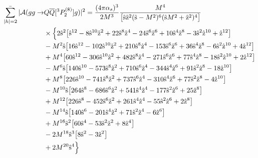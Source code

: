 \documentclass[aps,prc,preprint,superscriptaddress,showpacs,showkeys,amsmath]{revtex4-1}
\begin{document}
\begin{itemize}
\begin{equation}
\begin{split}
\mathop{{\bar{\sum_{|h|=2}}}} | {\cal A}(gg \to & Q{\overline Q}[ ^3P_2^{(8)}] g) |^2 ={(4\pi {\alpha_{s}})^3 \over 2 M^3}\frac{M^4}{\bigl[ \hat{\rm s} \hat{\rm z}^2 (\hat{\rm s}-M^2)^6 (\hat{\rm s} M^2 + \hat{\rm z}^2)^4 \bigr]}\\ 
                                     & \times  \Bigl\{ 2 \hat{\rm s}^2 \bigl[ \hat{\rm s}^{12} - 8 \hat{\rm s}^{10} \hat{\rm z}^2 + 22 \hat{\rm s}^8 \hat{\rm z}^4 - 24 \hat{\rm s}^6  \hat{\rm z}^6 + 10 \hat{\rm s}^4 \hat{\rm z}^8 - 3 \hat{\rm s}^2 \hat{\rm z}^{10} + \hat{\rm z}^{12} \bigr] \\
                                     & - M^2 \hat{\rm s} \bigl[ 16 \hat{\rm s}^{12} - 102 \hat{\rm s}^{10} \hat{\rm z}^2  + 210 \hat{\rm s}^8 \hat{\rm z}^4 - 153 \hat{\rm s}^6 \hat{\rm z}^6 + 36 \hat{\rm s}^4 \hat{\rm z}^8  - 6 \hat{\rm s}^2 \hat{\rm z}^{10}  + 4 \hat{\rm z}^{12} \bigr] \\
                                     & + M^4 \bigl[ 60 \hat{\rm s}^{12} - 306 \hat{\rm s}^{10} \hat{\rm z}^2  + 482 \hat{\rm s}^8 \hat{\rm z}^4 - 271 \hat{\rm s}^6 \hat{\rm z}^6 + 77 \hat{\rm s}^4 \hat{\rm z}^8 - 18 \hat{\rm s}^2 \hat{\rm z}^{10}  + 2 \hat{\rm z}^{12} \bigr] \\
                                     & - M^6 \hat{\rm s} \bigl[ 140 \hat{\rm s}^{10} - 573 \hat{\rm s}^8 \hat{\rm z}^2 + 710 \hat{\rm s}^6 \hat{\rm z}^4 - 344 \hat{\rm s}^4 \hat{\rm z}^6 + 91 \hat{\rm s}^2 \hat{\rm z}^8 - 18 \hat{\rm z}^{10} \bigr] \\
                                     & + M^8 \bigl[ 226 \hat{\rm s}^{10} - 741 \hat{\rm s}^8 \hat{\rm z}^2 + 737 \hat{\rm s}^6 \hat{\rm z}^4 - 310 \hat{\rm s}^4 \hat{\rm z}^6 + 77 \hat{\rm s}^2 \hat{\rm z}^8 - 4 \hat{\rm z}^{10} \bigr] \\
                                     & - M^{10} \hat{\rm s} \bigl[ 264 \hat{\rm s}^8 - 686 \hat{\rm s}^6 \hat{\rm z}^2 + 541 \hat{\rm s}^4 \hat{\rm z}^4 - 177 \hat{\rm s}^2 \hat{\rm z}^6 + 25 \hat{\rm z}^8 \bigr] \\
                                     & + M^{12} \bigl[ 226 \hat{\rm s}^8 - 452 \hat{\rm s}^6 \hat{\rm z}^2 + 261 \hat{\rm s}^4 \hat{\rm z}^4 - 55 \hat{\rm s}^2 \hat{\rm z}^6 + 2 \hat{\rm z}^8 \bigr] \\
                                     & - M^{14} \hat{\rm s} \bigl[ 140 \hat{\rm s}^6 - 201 \hat{\rm s}^4 \hat{\rm z}^2 + 71 \hat{\rm s}^2 \hat{\rm z}^4 - 6 \hat{\rm z}^6 \bigr] \\
                                     & + M^{16} \hat{\rm s}^2 \bigl[ 60 \hat{\rm s}^4 - 53 \hat{\rm s}^2 \hat{\rm z}^2 + 8 \hat{\rm z}^4 \bigr] \\
                                     & - 2 M^{18} \hat{\rm s}^3 \bigl[ 8 \hat{\rm s}^2 - 3 \hat{\rm z}^2 \bigr]\\
                                     & + 2 M^{20} \hat{\rm s}^4 \Bigr\} 
\end{split}  
\end{equation}
\end{itemize}
\end{document}
